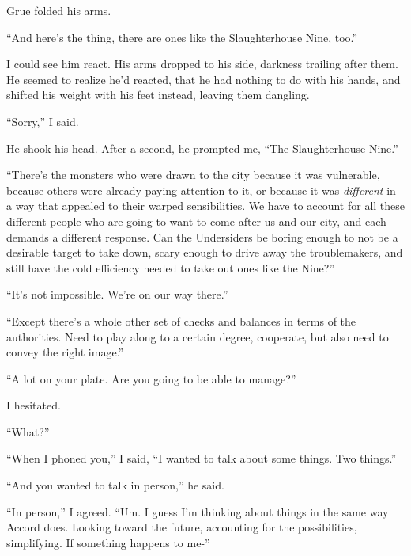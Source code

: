Grue folded his arms.



``And here's the thing, there are ones like the Slaughterhouse Nine, too.''



I could see him react.  His arms dropped to his side, darkness trailing after them.  He seemed to realize he'd reacted, that he had nothing to do with his hands, and shifted his weight with his feet instead, leaving them dangling.



``Sorry,'' I said.



He shook his head.  After a second, he prompted me, ``The Slaughterhouse Nine.''



``There's the monsters who were drawn to the city because it was vulnerable, because others were already paying attention to it, or because it was \emph{different} in a way that appealed to their warped sensibilities.  We have to account for all these different people who are going to want to come after us and our city, and each demands a different response.  Can the Undersiders be boring enough to not be a desirable target to take down, scary enough to drive away the troublemakers, and still have the cold efficiency needed to take out ones like the Nine?''



``It's not impossible.  We're on our way there.''



``Except there's a whole other set of checks and balances in terms of the authorities.  Need to play along to a certain degree, cooperate, but also need to convey the right image.''



``A lot on your plate.  Are you going to be able to manage?''



I hesitated.



``What?''



``When I phoned you,'' I said, ``I wanted to talk about some things.  Two things.''



``And you wanted to talk in person,'' he said.



``In person,'' I agreed.  ``Um.  I guess I'm thinking about things in the same way Accord does.  Looking toward the future, accounting for the possibilities, simplifying.  If something happens to me-''



